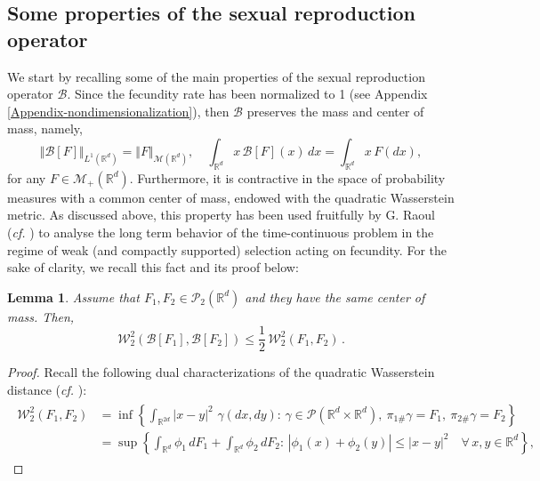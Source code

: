 \documentclass[reqno]{amsart}
\newtheorem{lemma}[definition]{Lemma}
\numberwithin{equation}{section}
\begin{document}
{\subsection{Some properties of the sexual reproduction operator}\label{SS-properties-B}
We start by recalling some of the main properties of the sexual reproduction operator $\mathcal B$. Since the fecundity rate has been normalized to 1 (see Appendix \ref{Appendix-nondimensionalization}), then $\mathcal{B}$ preserves the mass and center of mass, namely,
\begin{equation}\label{eq:conserved quantities}
\Vert \mathcal{B}[F]\Vert_{L^1(\mathbb{R}^d)} = \Vert F\Vert_{\mathcal{M}(\mathbb{R}^d)},\quad \int_{\mathbb{R}^d}x\,  \mathcal{B}[F](x)\, dx = \int_{\mathbb{R}^d} x \,F(dx),
\end{equation}
for any $F\in \mathcal{M}_+(\mathbb{R}^d)$. Furthermore, it is contractive in the space of probability measures with a common center of mass, endowed with the quadratic Wasserstein metric. As discussed above, this property has been used fruitfully by {\sc G. Raoul} ({\em cf.} \cite{R-21-arxiv}) to analyse the long term behavior of the time-continuous problem in the regime of weak (and compactly supported) selection acting on fecundity. For the sake of clarity, we recall this fact and its proof below: 
\begin{lemma}\label{lem:contraction W2} Assume that $F_1,F_2\in \mathcal{P}_2(\mathbb{R}^d)$ and they have the same center of mass. Then, 
\begin{equation*}
\mathcal W_2^2(\mathcal B[F_1],\mathcal B[F_2]) \leq \frac{1}{2}\,\mathcal W_2^2(F_1,F_2) \,.
\end{equation*}
\end{lemma}
\begin{proof}
Recall the following dual characterizations of the quadratic Wasserstein distance ({\em cf.} \cite{AGS-08, V-09}): 
\begin{align}\label{E-W2-characterizations}
\begin{split}
\mathcal W_2^2(F_1,F_2)  & = \inf\left\{\int_{\mathbb{R}^{2d}} |x-y|^2 \, \,\gamma(dx,dy):\,\gamma\in \mathcal{P}(\mathbb{R}^d\times \mathbb{R}^d),\ \pi_{1\#}\gamma=F_1,\ \pi_{2\#}\gamma=F_2\right\}\\
&= \sup\left\{ \int_{\mathbb{R}^d} \phi_1\,dF_1 + \int_{\mathbb{R}^d} \phi_2 \,dF_2 :\,\left| \phi_1(x) + \phi_2(y)\right| \leq |x-y|^2\quad  \forall\,x,y\in \mathbb{R}^d \right\},
\end{split}
\end{align}

\end{proof}}
\end{document}
